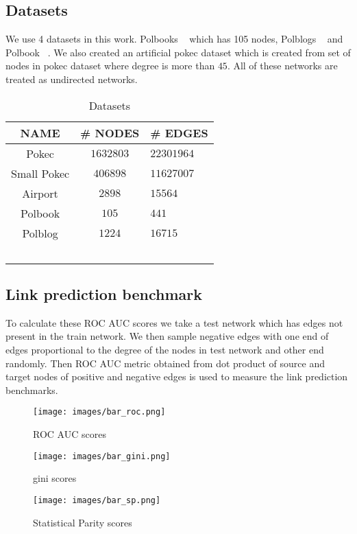 \documentclass[sigconf,authordraft]{acmart}
\begin{document}
\subsection{Datasets}
We use 4 datasets in this work. Polbooks ~\cite{nr} which has 105 nodes, Polblogs ~\cite{nr} and Polbook ~\cite{snapnets}. We also created an artificial pokec dataset which is created from set of nodes in pokec dataset where degree is more than $45$. All of these networks are treated as undirected networks.

\begin{table}
  \caption{Datasets}
  \label{table:datasets}
  \begin{tabular}{ccl}
    \toprule
    NAME & \#  NODES & \# EDGES\\
    \midrule
    Pokec       & $1632803$ & $22301964$ \\
    Small Pokec & $406898$ & $11627007$  \\
Airport & $2898$ & $15564$  \\
Polbook         &$105$&$441$  \\
Polblog         & $1224$ & $16715$  \\\
    \bottomrule
  \end{tabular}
\end{table}

\subsection{Link prediction benchmark}

To calculate these ROC AUC scores we take a test network which has edges not present in the train network. We then sample negative edges with one end of edges proportional to the degree of the nodes in test network and other end randomly. Then ROC AUC metric obtained from dot product of source and target nodes of positive and negative edges is used to measure the link prediction benchmarks.

\begin{figure}[h]
  \centering
  \texttt{[image: images/bar\_roc.png]}
  \caption{ROC AUC scores}
\end{figure}
\begin{figure}[h]
  \centering
  \texttt{[image: images/bar\_gini.png]}
  \caption{gini scores}
\end{figure}
\begin{figure}[h]
  \centering
  \texttt{[image: images/bar\_sp.png]}
  \caption{Statistical Parity scores}
\end{figure}
\end{document}
